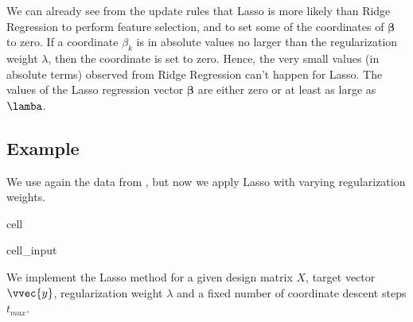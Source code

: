 \documentclass[letterpaper,10pt,english]{jupyterBook}
\begin{document}
\sphinxAtStartPar
We can already see from the update rules that Lasso is more likely than Ridge Regression to perform feature selection, and to set some of the coordinates of \(\bm\beta\) to zero. If a coordinate \(\beta_k\) is in absolute values no larger than the regularization weight \(\lambda\), then the coordinate is set to zero. Hence, the very small values (in absolute terms) observed from Ridge Regression can’t happen for Lasso. The values of the Lasso regression vector \(\bm\beta\) are either zero or at least as large as \(\lamba\).


\subsection{Example}
\label{\detokenize{regression_lasso:example}}
\sphinxAtStartPar
We use again the data from {\hyperref[\detokenize{regression_optimization:example_reg_p_larger_n}]{}}, but now we apply Lasso with varying regularization weights.

\begin{sphinxuseclass}{cell}\begin{sphinxVerbatimInput}

\begin{sphinxuseclass}{cell_input}
\begin{sphinxVerbatim}[commandchars=\\\{\}]
   

  \PYG{p}{[}\PYG{p}{]}
  \PYG{p}{[}\PYG{p}{]}
\end{sphinxVerbatim}

\end{sphinxuseclass}\end{sphinxVerbatimInput}

\end{sphinxuseclass}
\sphinxAtStartPar
We implement the Lasso method for a given design matrix \(X\), target vector \(\vvec{y}\), regularization weight \(\lambda\) and a fixed number of coordinate descent steps \(t_{max}\).
\end{document}
